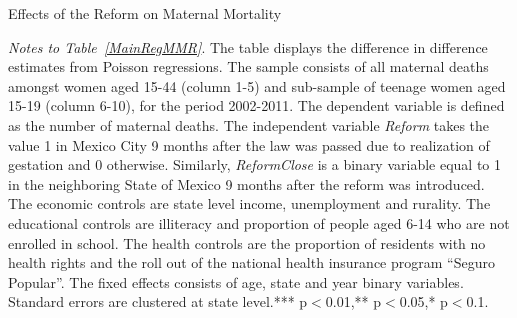 \documentclass[a4paper, 11pt]{article}
\begin{document}
\begin{spacing}{2}
\begin{table}\caption{Effects of the Reform on Maternal Mortality} \label{MainRegMMR}
\begin{threeparttable}
{\footnotesize}
\begin{tablenotes}
\footnotesize
\item \textit{Notes to Table~\ref{MainRegMMR}}. The table displays the difference in difference estimates from Poisson regressions. The sample consists of all maternal deaths amongst women aged 15-44 (column 1-5) and sub-sample of teenage women aged 15-19 (column 6-10), for the period 2002-2011. The dependent variable is defined as the number of maternal deaths. The independent variable \textit{Reform} takes the value 1 in Mexico City 9 months after the law was passed due to realization of gestation and 0 otherwise. Similarly, \textit{ReformClose} is a binary variable equal to 1 in the neighboring State of Mexico 9 months after the reform was introduced. The economic controls are state level income, unemployment and rurality. The educational controls are illiteracy and proportion of people aged 6-14 who are not enrolled in school. The health controls are the proportion of residents with no health rights and the roll out of the national health insurance program ``Seguro Popular''. The fixed effects consists of age, state and year binary variables. Standard errors are clustered at state level.*** p$<$0.01,** p$<$0.05,* p$<$0.1.
\end{tablenotes} 
\end{threeparttable}
\end{table}


\end{spacing}
\end{document}
